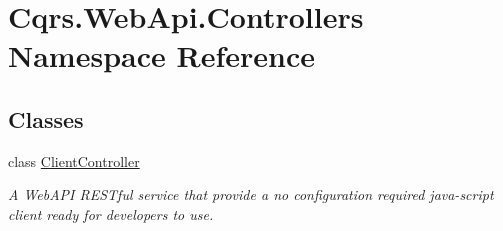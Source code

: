 \hypertarget{namespaceCqrs_1_1WebApi_1_1Controllers}{}\section{Cqrs.\+Web\+Api.\+Controllers Namespace Reference}
\label{namespaceCqrs_1_1WebApi_1_1Controllers}
\subsection*{Classes}
\begin{DoxyCompactItemize}
\item 
class \hyperlink{classCqrs_1_1WebApi_1_1Controllers_1_1ClientController}{Client\+Controller}
\begin{DoxyCompactList}\small\item\em A Web\+A\+PI R\+E\+S\+Tful service that provide a \textquotesingle{}no configuration required\textquotesingle{} java-\/script client ready for developers to use. \end{DoxyCompactList}\end{DoxyCompactItemize}
